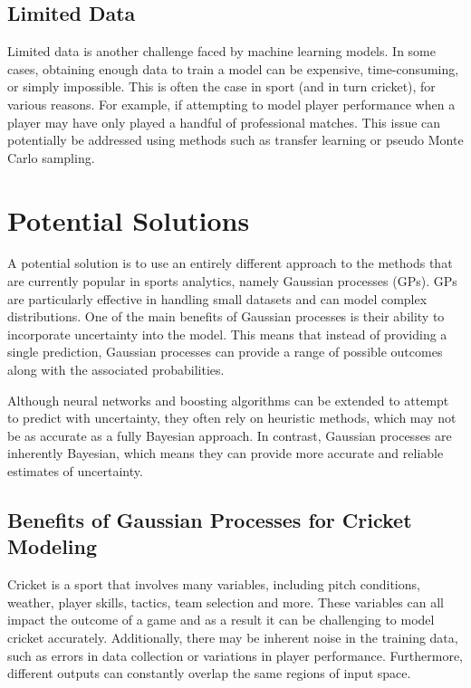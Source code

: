 \documentclass[12pt,a4paper]{report}
\theoremstyle{definition}
\begin{document}
\subsection{Limited Data}

Limited data is another challenge faced by machine learning models. 
In some cases, obtaining enough data to train a model can be expensive, time-consuming, or simply impossible. 
This is often the case in sport (and in turn cricket), for various reasons. 
For example, if attempting to model player performance when a player may have only played a handful of professional matches.
This issue can potentially be addressed using methods such as transfer learning or pseudo Monte Carlo sampling.

\section{Potential Solutions}

A potential solution is to use an entirely different approach to the methods that are currently popular in sports analytics, namely Gaussian processes (GPs).
GPs are particularly effective in handling small datasets and can model complex distributions. 
One of the main benefits of Gaussian processes is their ability to incorporate uncertainty into the model. 
This means that instead of providing a single prediction, Gaussian processes can provide a range of possible outcomes along with the associated probabilities. 

Although neural networks and boosting algorithms can be extended to attempt to predict with uncertainty, they often rely on heuristic methods, which may not be as accurate as a fully Bayesian approach. 
In contrast, Gaussian processes are inherently Bayesian, which means they can provide more accurate and reliable estimates of uncertainty.

\subsection{Benefits of Gaussian Processes for Cricket Modeling}

Cricket is a sport that involves many variables, including pitch conditions, weather, player skills, tactics, team selection and more.
These variables can all impact the outcome of a game and as a result it can be challenging to model cricket accurately. 
Additionally, there may be inherent noise in the training data, such as errors in data collection or variations in player performance.
Furthermore, different outputs can constantly overlap the same regions of input space.
\end{document}
